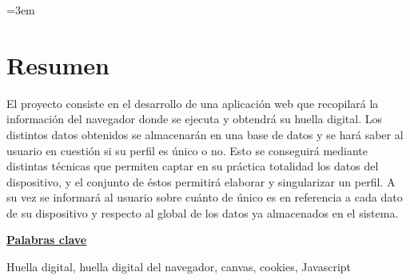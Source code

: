 \parindent=3em
\chapter*{Resumen}

El proyecto consiste en el desarrollo de una aplicación web que recopilará la información del navegador donde se ejecuta y obtendrá su huella digital. Los distintos datos obtenidos se almacenarán en una base de datos y se hará saber al usuario en cuestión si su perfil es único o no. Esto se conseguirá mediante distintas técnicas que permiten captar en su práctica totalidad los datos del dispositivo, y el conjunto de éstos permitirá elaborar y singularizar un perfil. A su vez se informará al usuario sobre cuánto de único es en referencia a cada dato de su dispositivo y respecto al global de los datos ya almacenados en el sistema. \par
\vspace{12mm}
\noindent
\underline{\Large{\textbf{Palabras clave}}}\par
\vspace{7mm}
\noindent
\normalsize{Huella digital, huella digital del navegador, canvas, cookies, Javascript}
